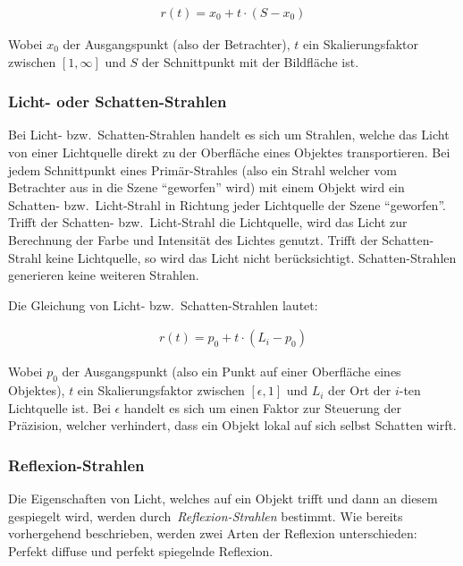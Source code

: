 \begin{gather}
    r(t) = x_{0} + t \cdot (S - x_{0})
\end{gather}

Wobei $x_{0}$ der Ausgangspunkt (also der Betrachter), $t$ ein
Skalierungsfaktor zwischen $[1, \infty]$ und $S$ der Schnittpunkt mit der
Bildfläche ist.

\subsubsection{Licht- oder Schatten-Strahlen}
\label{ssubsec:ray_tracing:shadow_rays}
Bei Licht- bzw.\ Schatten-Strahlen handelt es sich um Strahlen, welche
das Licht von einer Lichtquelle direkt zu der Oberfläche eines
Objektes transportieren. Bei jedem Schnittpunkt eines Primär-Strahles
(also ein Strahl welcher vom Betrachter aus in die Szene ``geworfen''
wird) mit einem Objekt wird ein Schatten- bzw.\ Licht-Strahl in Richtung jeder
Lichtquelle der Szene ``geworfen''. Trifft der Schatten- bzw.\
Licht-Strahl die Lichtquelle, wird das Licht zur Berechnung der Farbe
und Intensität des Lichtes genutzt. Trifft der Schatten-Strahl keine
Lichtquelle, so wird das Licht nicht berücksichtigt. Schatten-Strahlen
generieren keine weiteren Strahlen.

Die Gleichung von Licht- bzw.\ Schatten-Strahlen lautet:

\begin{gather}
    r(t) = p_{0} + t \cdot (L_{i} - p_{0})
\end{gather}

Wobei $p_{0}$ der Ausgangspunkt (also ein Punkt auf einer Oberfläche
eines Objektes), $t$ ein Skalierungsfaktor zwischen $[\epsilon, 1]$ und
$L_{i}$ der Ort der $i$-ten Lichtquelle ist. Bei $\epsilon$ handelt es
sich um einen Faktor zur Steuerung der Präzision, welcher verhindert,
dass ein Objekt lokal auf sich selbst Schatten wirft.


\subsubsection{Reflexion-Strahlen}
\label{ssubsec:ray_tracing:reflection_rays}

Die Eigenschaften von Licht, welches auf ein Objekt trifft und dann an
diesem gespiegelt wird, werden durch~\textit{Reflexion-Strahlen}
bestimmt. Wie bereits vorhergehend beschrieben, werden zwei Arten der
Reflexion unterschieden: Perfekt diffuse und perfekt spiegelnde Reflexion.

